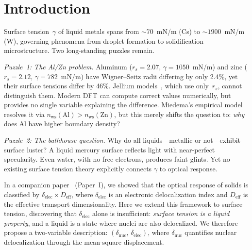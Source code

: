 \documentclass[twocolumn,showpacs,preprintnumbers,amsmath,amssymb,prb]{revtex4-2}
\begin{document}

\maketitle


\section{Introduction}
\label{sec:intro}

Surface tension~$\gamma$ of liquid metals spans from
$\sim\!70$~mN/m (Cs) to $\sim\!1900$~mN/m (W),
governing phenomena from droplet formation to
solidification microstructure.
Two long-standing puzzles remain.

\emph{Puzzle~1: The Al/Zn problem.}
Aluminum ($r_s = 2.07$, $\gamma = 1050$~mN/m) and
zinc ($r_s = 2.12$, $\gamma = 782$~mN/m)
have Wigner--Seitz radii differing by only 2.4\%,
yet their surface tensions differ by 46\%.
Jellium models~\cite{LangKohn1970}, which use only~$r_s$,
cannot distinguish them.
Modern DFT can compute correct values numerically,
but provides no single variable explaining the difference.
Miedema's empirical model~\cite{Miedema1978,deBoer1988}
resolves it via
$n_\mathrm{ws}(\mathrm{Al}) > n_\mathrm{ws}(\mathrm{Zn})$,
but this merely shifts the question to:
\emph{why} does Al have higher boundary density?

\emph{Puzzle~2: The bathhouse question.}
Why do all liquids---metallic or not---exhibit surface
luster?
A liquid mercury surface reflects light with near-perfect
specularity.
Even water, with no free electrons, produces faint glints.
Yet no existing surface tension theory explicitly connects
$\gamma$ to optical response.

In a companion paper~\cite{SentoOpticsPaper1} (Paper~I),
we showed that the optical response of solids is classified
by $\delta_\mathrm{elec} \times D_\mathrm{eff}$, where
$\delta_\mathrm{elec}$ is an electronic delocalization index
and $D_\mathrm{eff}$ is the effective transport dimensionality.
Here we extend this framework to surface tension,
discovering that $\delta_\mathrm{elec}$ alone is insufficient:
\emph{surface tension is a liquid property},
and a liquid is a state where nuclei are also delocalized.
We therefore propose a two-variable description:
$(\delta_\mathrm{nuc},\,\delta_\mathrm{elec})$, where
$\delta_\mathrm{nuc}$ quantifies nuclear delocalization
through the mean-square displacement.
\end{document}
